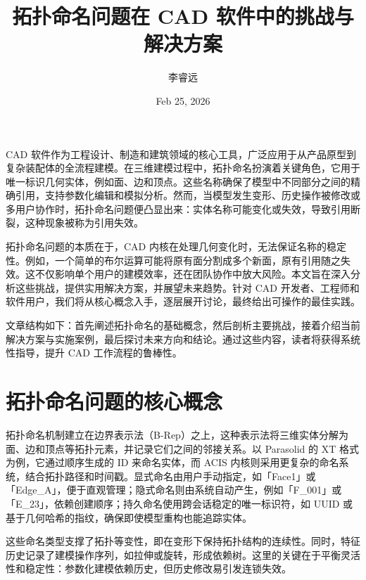 \title{拓扑命名问题在 CAD 软件中的挑战与解决方案}
\author{李睿远}
\date{Feb 25, 2026}
\maketitle
CAD 软件作为工程设计、制造和建筑领域的核心工具，广泛应用于从产品原型到复杂装配体的全流程建模。在三维建模过程中，拓扑命名扮演着关键角色，它用于唯一标识几何实体，例如面、边和顶点。这些名称确保了模型中不同部分之间的精确引用，支持参数化编辑和模拟分析。然而，当模型发生变形、历史操作被修改或多用户协作时，拓扑命名问题便凸显出来：实体名称可能变化或失效，导致引用断裂，这种现象被称为引用失效。\par
拓扑命名问题的本质在于，CAD 内核在处理几何变化时，无法保证名称的稳定性。例如，一个简单的布尔运算可能将原有面分割成多个新面，原有引用随之失效。这不仅影响单个用户的建模效率，还在团队协作中放大风险。本文旨在深入分析这些挑战，提供实用解决方案，并展望未来趋势。针对 CAD 开发者、工程师和软件用户，我们将从核心概念入手，逐层展开讨论，最终给出可操作的最佳实践。\par
文章结构如下：首先阐述拓扑命名的基础概念，然后剖析主要挑战，接着介绍当前解决方案与实施案例，最后探讨未来方向和结论。通过这些内容，读者将获得系统性指导，提升 CAD 工作流程的鲁棒性。\par
\chapter{拓扑命名问题的核心概念}
拓扑命名机制建立在边界表示法（B-Rep）之上，这种表示法将三维实体分解为面、边和顶点等拓扑元素，并记录它们之间的邻接关系。以 Parasolid 的 XT 格式为例，它通过顺序生成的 ID 来命名实体，而 ACIS 内核则采用更复杂的命名系统，结合拓扑路径和时间戳。显式命名由用户手动指定，如「Face1」或「Edge\_{}A」，便于直观管理；隐式命名则由系统自动产生，例如「F\_{}001」或「E\_{}23」，依赖创建顺序；持久命名使用跨会话稳定的唯一标识符，如 UUID 或基于几何哈希的指纹，确保即使模型重构也能追踪实体。\par
这些命名类型支撑了拓扑等变性，即在变形下保持拓扑结构的连续性。同时，特征历史记录了建模操作序列，如拉伸或旋转，形成依赖树。这里的关键在于平衡灵活性和稳定性：参数化建模依赖历史，但历史修改易引发连锁失效。\par
